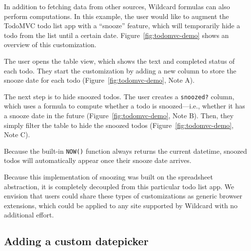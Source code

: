 \documentclass[sigplan,10pt,anonymous,review]{acmart}
\begin{document}
In addition to fetching data from other sources, Wildcard formulas can
also perform computations. In this example, the user would like to
augment the TodoMVC todo list app with a ``snooze'' feature, which will
temporarily hide a todo from the list until a certain date.{
Figure~\ref{fig:todomvc-demo} shows an overview of this customization.}

The user opens the table view, which shows the text and completed status
of each todo. They start the customization by adding a new column to
store the snooze date for each todo{ (Figure~\ref{fig:todomvc-demo},
Note A)}.

The next step is to hide snoozed todos. The user creates a
\texttt{snoozed?} column, which uses a formula to compute whether a todo
is snoozed---i.e., whether it has a snooze date in the future{
(Figure~\ref{fig:todomvc-demo}, Note B)}. Then, they simply filter the
table to hide the snoozed todos{ (Figure~\ref{fig:todomvc-demo}, Note
C)}.

Because the built-in \texttt{NOW()} function always returns the current
datetime, snoozed todos will automatically appear once their snooze date
arrives.

Because this implementation of snoozing was built on the spreadsheet
abstraction, it is completely decoupled from this particular todo list
app. We envision that users could share these types of customizations as
generic browser extensions, which could be applied to any site supported
by Wildcard with no additional effort.

\hypertarget{adding-a-custom-datepicker}{%
\subsection{Adding a custom
datepicker}\label{adding-a-custom-datepicker}}
\end{document}
